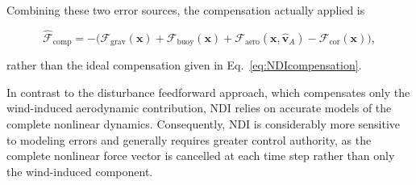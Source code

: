 Combining these two error sources, the compensation actually applied is

\begin{equation}
	\boxed{
		\hat{\bm{\mathcal{F}}}_\mathrm{comp} 
		= 
		-\Big(
		\bm{\mathcal{F}}_\mathrm{grav}(\bm{x}) 
		+ 
		\bm{\mathcal{F}}_\mathrm{buoy}(\bm{x}) 
		+ 
		\bm{\mathcal{F}}_\mathrm{aero}(\bm{x}, \hat{\bm{v}}_A) 
		- 
		\bm{\mathcal{F}}_\mathrm{cor}(\bm{x})
		\Big),
	}
	\label{eq:NDIcompensationRealized}
\end{equation}

rather than the ideal compensation given in Eq.~\eqref{eq:NDIcompensation}.

In contrast to the disturbance feedforward approach, which compensates only the wind-induced aerodynamic contribution, NDI relies on accurate models of the complete nonlinear dynamics. Consequently, NDI is considerably more sensitive to modeling errors and generally requires greater control authority, as the complete nonlinear force vector is cancelled at each time step rather than only the wind-induced component.
